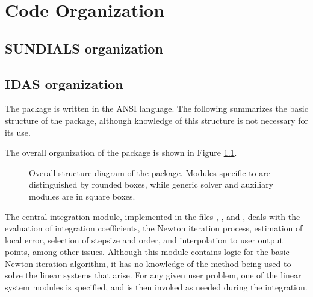 \chapter{Code Organization}\label{s:organization}

\section{SUNDIALS organization}\label{ss:sun_org}


\section{IDAS organization}\label{ss:idas_org}

The {\idas} package is written in the ANSI {\C} language. The following
summarizes the basic structure of the package, although knowledge
of this structure is not necessary for its use.

The overall organization of the {\idas} package is shown in Figure
\ref{f:idasorg}.
\begin{figure}
{\centerline{}}
\caption [Overall structure diagram of the {\idas} package]
{Overall structure diagram of the {\idas} package.
  Modules specific to {\idas} are distinguished by rounded boxes, while 
  generic solver and auxiliary modules are in square boxes.}
\label{f:idasorg}
\end{figure}
The central integration module, implemented in the files ,
, and , deals with the evaluation of integration 
coefficients, the Newton iteration process, estimation of local error,
selection of stepsize and order, and interpolation to user output
points, among other issues.  Although this module contains logic for
the basic Newton iteration algorithm, it has no knowledge of the
method being used to solve the linear systems that arise.  For any
given user problem, one of the linear system modules is specified, and
is then invoked as needed during the integration. 

